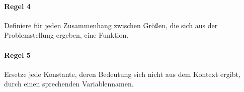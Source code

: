 \documentclass[../main.tex]{subfiles}
\begin{document}
        \paragraph{Regel 4}
            Definiere für jeden Zusammenhang zwischen Größen, die sich aus der Problemstellung ergeben, eine Funktion.
            
        \paragraph{Regel 5}
            Ersetze jede Konstante, deren Bedeutung sich nicht aus dem Kontext ergibt, durch einen sprechenden Variablennamen.
\end{document}
